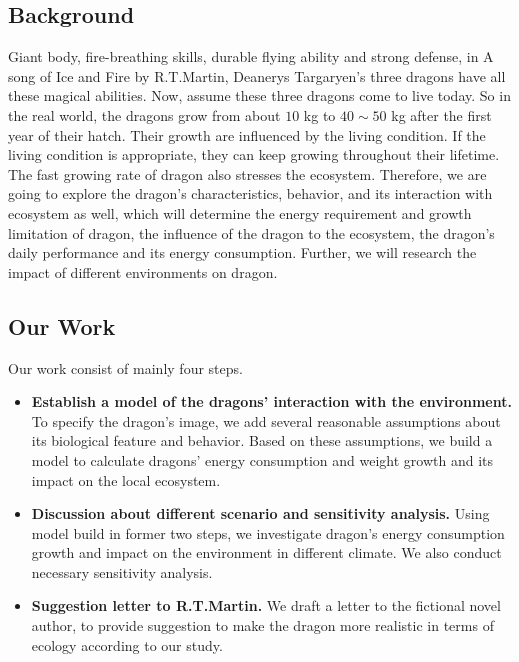 \documentclass{mcmthesis}
\newcommand{\upcite}[1]{\textsuperscript{\textsuperscript{\cite{#1}}}}
\begin{document}


\subsection{Background}
Giant body, fire-breathing skills, durable flying ability and strong defense, in A song of Ice and Fire by R.T.Martin, Deanerys Targaryen’s three dragons have all these magical abilities. Now, assume these three dragons come to live today. So in the real world, the dragons grow from about $10$ kg to $40\sim50$ kg after the first year of their hatch. Their growth are influenced by the living condition. If the living condition is appropriate, they can keep growing throughout their lifetime. The fast growing rate of dragon also stresses the ecosystem. Therefore, we are going to explore the dragon’s characteristics, behavior, and its interaction with ecosystem as well, which will determine the energy requirement and growth limitation of dragon, the influence of the dragon to the ecosystem, the dragon’s daily performance and its energy consumption. Further, we will research the impact of different environments on dragon. 



\subsection{Our Work}
Our work consist of mainly four steps.

\begin{itemize} 
\item \textbf{Establish a model of the dragons' interaction with the environment.} To specify the dragon’s image, we add several reasonable assumptions about its biological feature and behavior. Based on these assumptions, we build a model to calculate dragons' energy consumption and weight growth and its impact on the local ecosystem.
\item \textbf{Discussion about different scenario and sensitivity analysis.} Using model build in former two steps, we investigate dragon's energy consumption growth and impact on the environment in different climate. We also conduct necessary sensitivity analysis.
\item \textbf{Suggestion letter to R.T.Martin.} We draft a letter to the fictional novel author, to provide suggestion to make the dragon more realistic in terms of ecology according to our study.
\end{itemize}
\end{document}
